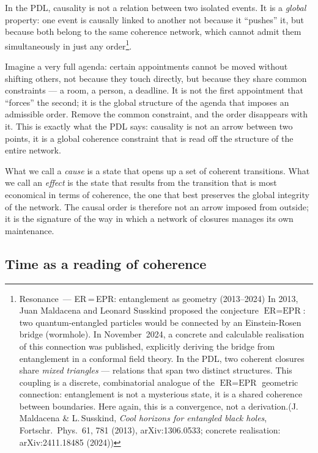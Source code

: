 \documentclass[11pt, a4paper, openright]{book}
\begin{document}
In the PDL, causality is not a relation between two isolated events. It is a \emph{global} property: one event is causally linked to another not because it “pushes” it, but because both belong to the same coherence network, which cannot admit them simultaneously in just any order\footnote{{Resonance~--- ER\,=\,EPR: entanglement as geometry (2013--2024)} In 2013, Juan Maldacena and Leonard Susskind proposed the conjecture $\text{ER} = \text{EPR}$: two quantum-entangled particles would be connected by an Einstein-Rosen bridge (wormhole). In November~2024, a concrete and calculable realisation of this connection was published, explicitly deriving the bridge from entanglement in a conformal field theory. In the PDL, two coherent closures share \emph{mixed triangles} --- relations that span two distinct structures. This coupling is a discrete, combinatorial analogue of the $\text{ER} = \text{EPR}$ geometric connection: entanglement is not a mysterious state, it is a shared coherence between boundaries. Here again, this is a convergence, not a derivation.(J.\,Maldacena \& L.\,Susskind, \textit{Cool horizons for entangled black holes}, Fortschr.\ Phys.\ 61, 781 (2013), arXiv:1306.0533; concrete realisation: arXiv:2411.18485 (2024))}.

\medskip

Imagine a very full agenda: certain appointments cannot be moved without shifting others, not because they touch directly, but because they share common constraints — a room, a person, a deadline. It is not the first appointment that “forces” the second; it is the global structure of the agenda that imposes an admissible order. Remove the common constraint, and the order disappears with it. This is exactly what the PDL says: causality is not an arrow between two points, it is a global coherence constraint that is read off the structure of the entire network.

\medskip

What we call a \emph{cause} is a state that opens up a set of coherent transitions. What we call an \emph{effect} is the state that results from the transition that is most economical in terms of coherence, the one that best preserves the global integrity of the network. The causal order is therefore not an arrow imposed from outside; it is the signature of the way in which a network of closures manages its own maintenance.

\subsection*{Time as a reading of coherence}
\end{document}
